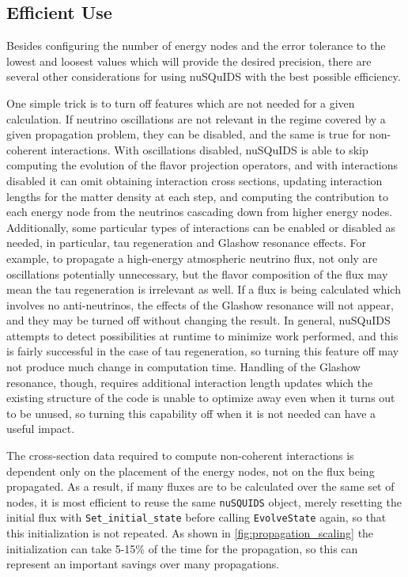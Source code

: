 \documentclass[3p,12pt]{elsarticle}
\newcommand{\ttf}{\ttfamily}
\begin{document}
\subsection{Efficient Use}
\label{ssec:efficient_use}

Besides configuring the number of energy nodes and the error tolerance to the lowest and loosest values which will provide the desired precision, there are several other considerations for using {\ttf nuSQuIDS} with the best possible efficiency. 

One simple trick is to turn off features which are not needed for a given calculation. 
If neutrino oscillations are not relevant in the regime covered by a given propagation problem, they can be disabled, and the same is true for non-coherent interactions. 
With oscillations disabled, {\ttf nuSQuIDS} is able to skip computing the evolution of the flavor projection operators, and with interactions disabled it can omit obtaining interaction cross sections, updating interaction lengths for the matter density at each step, and computing the contribution to each energy node from the neutrinos cascading down from higher energy nodes. 
Additionally, some particular types of interactions can be enabled or disabled as needed, in particular, tau regeneration and Glashow resonance effects. 
For example, to propagate a high-energy atmospheric neutrino flux, not only are oscillations potentially unnecessary, but the flavor composition of the flux may mean the tau regeneration is irrelevant as well. 
If a flux is being calculated which involves no anti-neutrinos, the effects of the Glashow resonance will not appear, and they may be turned off without changing the result. 
In general, {\ttf nuSQuIDS} attempts to detect possibilities at runtime to minimize work performed, and this is fairly successful in the case of tau regeneration, so turning this feature off may not produce much change in computation time. 
Handling of the Glashow resonance, though, requires additional interaction length updates which the existing structure of the code is unable to optimize away even when it turns out to be unused, so turning this capability off when it is not needed can have a useful impact. 

The cross-section data required to compute non-coherent interactions is dependent only on the placement of the energy nodes, not on the flux being propagated. 
As a result, if many fluxes are to be calculated over the same set of nodes, it is most efficient to reuse the same \lstinline{nuSQUIDS} object, merely resetting the initial flux with \lstinline{Set_initial_state} before calling \lstinline{EvolveState} again, so that this initialization is not repeated. 
As shown in \ref{fig:propagation_scaling} the initialization can take 5-15\% of the time for the propagation, so this can represent an important savings over many propagations. 
\end{document}
